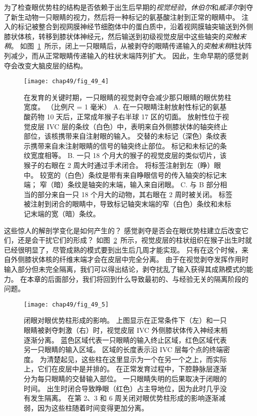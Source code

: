 为了检查眼优势柱的结构是否依赖于出生后早期的\textit{视觉经验}，\textit{休伯尔}和\textit{威泽尔}剥夺了新生动物一只眼睛的视力，然后将一种标记的氨基酸注射到正常的眼睛中。
注入的标记被整合到视网膜神经节细胞体中的蛋白质中，沿着视网膜轴突输送到外侧膝状体核，转移到膝状体神经元，然后输送到初级视觉皮层中这些轴突的\textit{突触末稍}。
如图~\ref{fig:49_4}~所示，闭上一只眼睛后，从被剥夺的眼睛传递输入的\textit{突触末稍}柱状阵列减少，而从正常眼睛传递输入的柱状末端阵列扩大。
因此，生命早期的感觉剥夺会改变大脑皮层的结构。


\begin{figure}[htbp]
	\centering
	\texttt{[image: chap49/fig\_49\_4]}
	\caption{在发育的关键时期，一只眼睛的视觉剥夺会减少那只眼睛的眼优势柱宽度。
		（比例尺 = 1 毫米）\cite{hubel1977ferrier}
		A. 在一只眼睛注射放射性标记的氨基酸药物 10 天后，正常成年猴子右半球 17 区的切面。
		放射性位于视觉皮层 IVC 层的条纹（白色）中，表明来自外侧膝状体的轴突终止部位，该核携带来自注射眼的输入。
		交替的未标记（深色）条纹表示携带来自未注射眼睛的信号的轴突终止部位。
		标记和未标记的条纹宽度相等。
		B. 一只 18 个月大的猴子的视觉皮层的类似切片，该猴子的右眼在 2 周大时通过手术闭合。
		将标签注射到左（睁）眼中。
		较宽的（白色）条纹是带有来自睁眼信号的传入轴突的标记末端； 窄（暗）条纹是轴突的末端，输入来自闭眼。
		C. 与 B 部分相当的部分来自一只 18 个月大的动物，其右眼在 2 周时被关闭。
		标签被注射到闭合的眼睛中，导致标记轴突末端的窄（白色）条纹和未标记末端的宽（暗）条纹。}
	\label{fig:49_4}
\end{figure}


这些惊人的解剖学变化是如何产生的？
感觉剥夺是否会在眼优势柱建立后改变它们，还是会干扰它们的形成？
如图~\ref{fig:49_5}~所示，视觉皮层的柱状组织在猴子出生时就已经很明显了，尽管成熟的模式要到出生后几周才能实现。
只有在这个时候，来自外侧膝状体核的纤维末端才会在皮层中完全分离。
由于在视觉剥夺发挥作用时输入部分但未完全隔离，我们可以得出结论，剥夺扰乱了输入获得其成熟模式的能力。
在本章的后面部分，我们将回到什么导致最初的、与经验无关的隔离阶段的问题。


\begin{figure}[htbp]
	\centering
	\texttt{[image: chap49/fig\_49\_5]}
	\caption{闭眼对眼优势柱形成的影响。
		上图显示在正常条件下（左）和一只眼睛被剥夺刺激（右）时，视觉皮层 IVC 外侧膝状体传入神经末梢逐渐分离。
		蓝色区域代表一只眼睛的输入终止区域，红色区域代表另一只眼睛的输入区域。
		区域的长度表示沿 IVC 层每个点的终端密度。
		为清楚起见，这些柱在这里显示为一个在另一个之上，而实际上，它们在皮层中是并排的。
		在正常发育过程中，下腔静脉层逐渐分为每只眼睛的交替输入部位。
		一只眼睛失明的后果取决于闭眼的时间。
		出生时闭合导致睁眼（红色）占主导地位，因为此时几乎没有发生隔离。
		在第 2、3 和 6 周关闭对眼优势柱形成的影响逐渐减弱，因为这些柱随着时间变得更加分离\cite{hubel1977ferrier}。 }
	\label{fig:49_5}
\end{figure}


